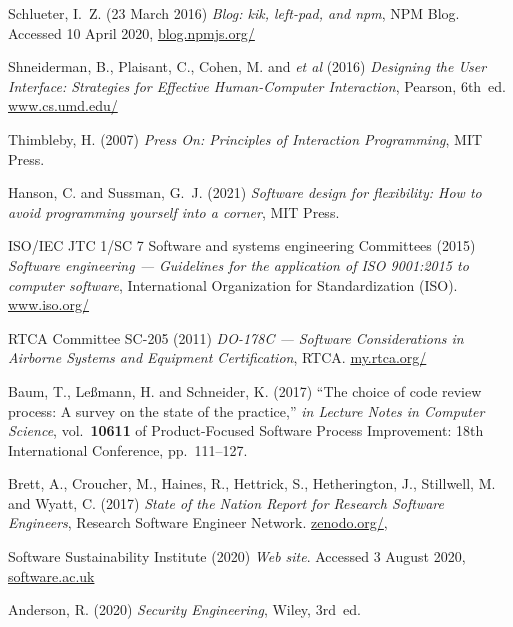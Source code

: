 \documentclass[10pt,a4paper]{article}
\begin{document}
{\begin{thebibliography}{10}
Schlueter, I.~Z. (23 March 2016) {\em Blog: kik, left-pad, and npm}, NPM Blog.
\newblock Accessed 10 April 2020,
  \url{blog.npmjs.org/}

Shneiderman, B., Plaisant, C., Cohen, M. and {\emph{et al}} (2016) {\em
  Designing the User Interface: Strategies for Effective Human-Computer
  Interaction}, Pearson, 6th~ed.
\newblock \url{www.cs.umd.edu/}

Thimbleby, H. (2007) {\em Press On: Principles of Interaction Programming}, MIT
  Press.

Hanson, C. and Sussman, G.~J. (2021) {\em Software design for flexibility: How
  to avoid programming yourself into a corner}, MIT Press.

{ISO/IEC JTC 1/SC 7 Software and systems engineering Committees} (2015) {\em
  Software engineering --- Guidelines for the application of ISO 9001:2015 to
  computer software}, International Organization for Standardization (ISO).
\newblock \url{www.iso.org/}

{RTCA Committee SC-205} (2011) {\em DO-178C --- Software Considerations in
  Airborne Systems and Equipment Certification}, RTCA.
\newblock \url{my.rtca.org/}

Baum, T., {Le\ss mann}, H. and Schneider, K. (2017) ``The choice of code review
  process: A survey on the state of the practice,'' {\em in Lecture Notes in
  Computer Science}, vol.~\textbf{10611} of Product-Focused Software Process
  Improvement: 18th International Conference, pp.~111--127.
\newblock {}

Brett, A., Croucher, M., Haines, R., Hettrick, S., Hetherington, J., Stillwell,
  M. and Wyatt, C. (2017) {\em State of the Nation Report for Research Software
  Engineers}, Research Software Engineer Network.
\newblock \url{zenodo.org/},

{Software Sustainability Institute} (2020) {\em Web site}.
\newblock Accessed 3 August 2020, \url{software.ac.uk}

Anderson, R. (2020) {\em Security Engineering}, Wiley, 3rd~ed.


\end{thebibliography}}
\end{document}
